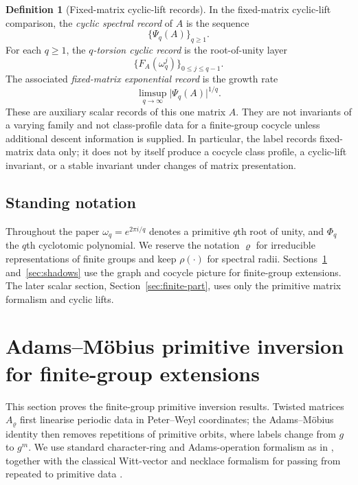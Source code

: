 \documentclass[11pt,a4paper]{amsart}
\theoremstyle{plain}
\theoremstyle{definition}
\newtheorem{definition}[theorem]{Definition}
\theoremstyle{remark}
\newcommand{\abs}[1]{\lvert #1 \rvert}
\begin{document}
\begin{definition}[Fixed-matrix cyclic-lift records]
  \label{def:spectral-fingerprints}
  In the fixed-matrix cyclic-lift comparison, the
  \emph{cyclic spectral record} of \(A\) is the sequence
  \[
    \{\Psi_q(A)\}_{q\ge 1}.
  \]
  For each \(q\ge 1\), the \emph{\(q\)-torsion cyclic record} is the
  root-of-unity layer
  \[
    \{F_A(\omega_q^j)\}_{0\le j\le q-1}.
  \]
  The associated \emph{fixed-matrix exponential record} is the growth rate
  \[
    \limsup_{q\to\infty}\abs{\Psi_q(A)}^{1/q}.
  \]
  These are auxiliary scalar records of this one matrix \(A\). They are
  not invariants of a varying family and not class-profile data for a
  finite-group cocycle unless additional descent information is supplied. In
  particular, the label records fixed-matrix data only; it does not by
  itself produce a cocycle class profile, a cyclic-lift invariant, or a
  stable invariant under changes of matrix presentation.
\end{definition}

\subsection{Standing notation}

Throughout the paper \(\omega_q=e^{2\pi i/q}\) denotes a primitive
\(q\)th root of unity, and \(\Phi_q\) the \(q\)th cyclotomic
polynomial. We reserve the notation \(\varrho\) for irreducible
representations of finite groups and keep \(\rho(\cdot)\) for spectral
radii. Sections~\ref{sec:chebotarev} and~\ref{sec:shadows} use the
graph and cocycle picture for finite-group extensions. The later scalar
section, Section~\ref{sec:finite-part}, uses only the primitive matrix
formalism and cyclic lifts.


\section{Adams--M\"obius primitive inversion for finite-group extensions}
\label{sec:chebotarev}

This section proves the finite-group primitive inversion results. Twisted matrices
\(A_\varrho\) first linearise periodic data in Peter--Weyl coordinates;
the Adams--M\"obius identity then removes repetitions of primitive
orbits, where labels change from \(g\) to \(g^m\). We use standard
character-ring and Adams-operation formalism as in
\cite{AtiyahTall1969GroupRepresentationsLambdaRings,Serre1977LinearRepresentations,Knutson1973LambdaRings}, together with
the classical Witt-vector and necklace formalism for passing from
repeated to primitive data
\cite{DressSiebeneicher1988BurnsideRing,MetropolisRota1983Necklaces,Wehrhahn1990AperiodicRings}.
\end{document}
